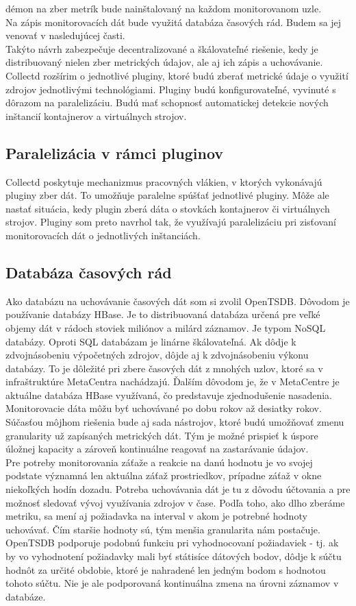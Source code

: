 \documentclass[11pt,final,oneside]{fithesis}
\begin{document}
démon na zber metrík bude nainštalovaný na každom monitorovanom uzle.
\\Na zápis monitorovacích dát bude využitá databáza časových rád. Budem sa jej venovať v nasledujúcej časti.
\\Takýto návrh zabezpečuje decentralizované a škálovateľné riešenie, kedy je distribuovaný nielen zber metrických údajov, ale aj ich zápis a uchovávanie.
\\Collectd rozšírim o jednotlivé pluginy, ktoré budú zberať metrické údaje o využití zdrojov jednotlivými technológiami. Pluginy budú 
konfigurovateľné, vyvinuté s dôrazom na paralelizáciu. Budú mať schopnosť automatickej detekcie nových inštancií kontajnerov a virtuálnych
strojov.

\subsection{Paralelizácia v rámci pluginov}
Collectd poskytuje mechanizmus pracovných vlákien, v ktorých vykonávajú pluginy zber dát. To umožňuje paralelne spúšťať jednotlivé pluginy.
Môže ale nastať situácia, kedy plugin zberá dáta o stovkách kontajnerov či virtuálnych strojov. Pluginy som preto navrhol tak, že využívajú
paralelizáciu pri zisťovaní monitorovacích dát o jednotlivých inštanciách. 

\subsection{Databáza časových rád}
Ako databázu na uchovávanie časových dát som si zvolil OpenTSDB. Dôvodom je používanie databázy HBase. Je to distribuovaná databáza určená pre veľké objemy dát v rádoch stoviek miliónov a milárd záznamov. 
Je typom NoSQL databázy. Oproti SQL databázam je linárne škálovateľná. Ak dôdje k zdvojnásobeniu výpočetných zdrojov, dôjde aj k zdvojnásobeniu výkonu databázy. To je dôležité pri zbere časových dát z mnohých
uzlov, ktoré sa v infraštruktúre MetaCentra nachádzajú. Ďalším dôvodom je, že v MetaCentre je aktuálne databáza HBase využívaná, čo predstavuje zjednodušenie nasadenia. 
\\Monitorovacie dáta môžu byť uchovávané po dobu rokov až desiatky rokov. Súčasťou môjhom riešenia bude aj sada nástrojov, ktoré budú
umožňovať zmenu granularity už zapísaných metrických dát. Tým je možné prispieť k úspore úložnej kapacity a zároveň kontinuálne reagovať na
zastarávanie údajov. 
\\Pre potreby monitorovania záťaže a reakcie na danú hodnotu je vo svojej podstate významná len aktuálna záťaž prostriedkov, prípadne záťaž v okne niekoľkých hodín 
dozadu. Potreba uchovávania dát je tu z dôvodu účtovania a pre možnosť sledovať vývoj využívania zdrojov v čase.
Podľa toho, ako dlho zberáme metriku, sa mení aj požiadavka na interval v akom je potrebné hodnoty uchovávať. Čím staršie hodnoty sú,
tým menšia granularita nám postačuje.
\\OpenTSDB podporuje podobnú funkciu pri vyhodnocovaní požiadaviek - tj. ak by vo vyhodnotení požiadavky mali byť státisíce dátových bodov,
dôdje k súčtu hodnôt za určité obdobie, ktoré je nahradené len jedným bodom s hodnotou tohoto súčtu. Nie je ale podporovaná kontinuálna
zmena na úrovni záznamov v databáze.
  
\end{document}
